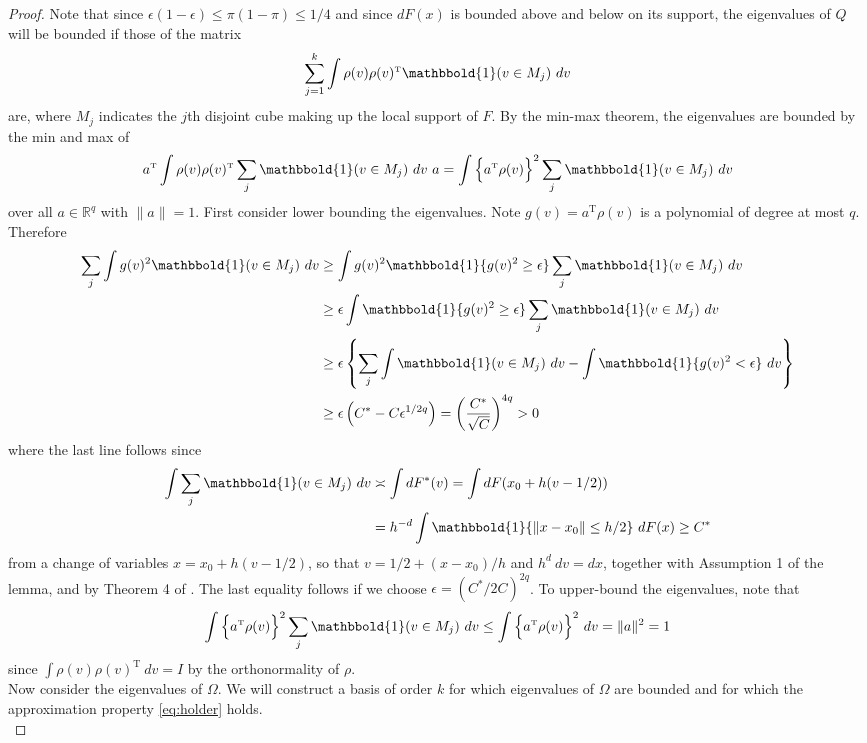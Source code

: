 \documentclass[11pt,twoside]{article}
\def\T{{ \mathrm{\scriptscriptstyle T} }}
\newcommand{\R}{\mathbb{R}}
\newcommand{\Holder}{\text{H\"{o}lder}}
\newcommand{\one}{\mathbbold{1}}
\theoremstyle{definition}
\theoremstyle{remark}
\begin{document}
\bigskip

\begin{proof}
Note that since $\epsilon(1-\epsilon) \leq \pi(1-\pi) \leq 1/4$ and since $dF(x)$ is bounded above and below on its support, the eigenvalues of $Q$ will be bounded if those of the matrix 
$$ \sum_{j=1}^k \int \rho(v) \rho(v)^\T \one(v \in M_j) \ dv $$
are, where $M_j$ indicates the $j$th disjoint cube making up the local support of $F$.  By the min-max theorem, the eigenvalues are bounded by the min and max of
$$  a^\T \int \rho(v) \rho(v)^\T \sum_j \one(v \in M_j) \ dv \ a = \int \Big\{ a^\T \rho(v) \Big\}^2 \sum_j \one(v \in M_j) \ dv   $$
over all $a \in \R^q$ with $\| a\|=1$. First consider lower bounding the eigenvalues. 
Note $g(v) = a^\T \rho(v)$ is a polynomial of degree at most $q$. Therefore
\begin{align*}
\sum_j \int g(v)^2 \one(v \in M_j) \ dv &\geq \int g(v)^2 \one\{ g(v)^2 \geq \epsilon \} \sum_j \one(v \in M_j) \ dv \\
& \geq \epsilon \int \one\{ g(v)^2 \geq \epsilon \} \sum_j \one(v \in M_j) \ dv \\
& \geq \epsilon \left\{ \sum_j \int \one(v \in M_j) \ dv - \int \one\{ g(v)^2 < \epsilon \} \ dv \right\} \\
& \geq \epsilon \left( C^* - C \epsilon^{1/2q} \right)  = \left( \frac{C^*}{\sqrt{C}} \right)^{4q} > 0 
\end{align*}
where the last line follows since
\begin{align*}
\int \sum_j \one( v \in M_j) \ dv & \asymp \int dF^*(v) = \int dF(x_0 + h(v-1/2)) \\
&= h^{-d} \int \one\{ \|x-x_0 \| \leq h/2 \} \ dF(x) \geq C^*
\end{align*}
from a change of variables $x = x_0 + h(v-1/2)$, so that $v = 1/2 + (x-x_0)/h$ and $h^d \ dv = dx$, together with Assumption 1 of the lemma,  and by Theorem 4 of \citet{carbery2001distributional}. The last equality follows if we choose $\epsilon =\left(  C^*/2C \right)^{2q}$. To upper-bound the eigenvalues, note that
\begin{align*}
 \int \Big\{ a^\T \rho(v) \Big\}^2 \sum_j \one(v \in M_j) \ dv  \leq  \int \Big\{ a^\T \rho(v) \Big\}^2  \ dv = \| a \|^2 = 1
\end{align*}
since $\int \rho(v) \rho(v)^\T \ dv = I$ by the orthonormality of $\rho$. \\

Now consider the eigenvalues of $\Omega$. We will construct a basis of order $k$ for which eigenvalues of $\Omega$ are bounded and for which the \Holder{} approximation property \eqref{eq:holder} holds.  \\


\end{proof}
\end{document}
